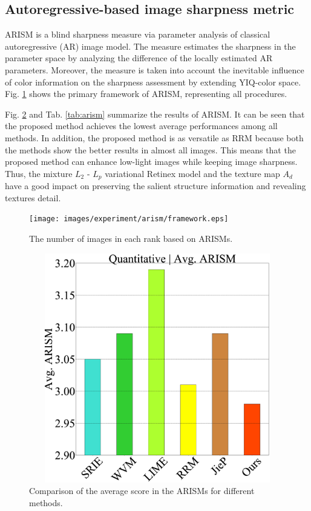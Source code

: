 \subsection{Autoregressive-based image sharpness metric}
ARISM is a blind sharpness measure via parameter analysis of classical autoregressive (AR) image model. The measure estimates the sharpness in the parameter space by analyzing the difference of the locally estimated AR parameters. Moreover, the measure is taken into account the inevitable influence of color information on the sharpness assessment by extending YIQ-color space. Fig. \ref{fig:arism/framework} shows the primary framework of ARISM, representing all procedures.\par
Fig. \ref{fig:arism} and Tab. \ref{tab:arism} summarize the results of ARISM. It can be seen that the proposed method achieves the lowest average performances among all methods. In addition, the proposed method is as versatile as RRM because both the methods show the better results in almost all images. This means that the proposed method can enhance low-light images while keeping image sharpness. Thus, the mixture $L_{2}$ - $L_{p}$ variational Retinex model and the texture map $A_{d}$ have a good impact on preserving the salient structure information and revealing textures detail.
\begin{figure}[tb]
	\centering
	\texttt{[image: images/experiment/arism/framework.eps]}
	\caption{The number of images in each rank based on ARISMs.} \label{fig:arism/framework}
\end{figure}
\begin{figure}[tb]
	\centering
	\includegraphics[width=125mm, height=100mm]{images/experiment/quantitative/arism.eps}
	\caption{Comparison of the average score in the ARISMs for different methods.} \label{fig:arism}
\end{figure}
